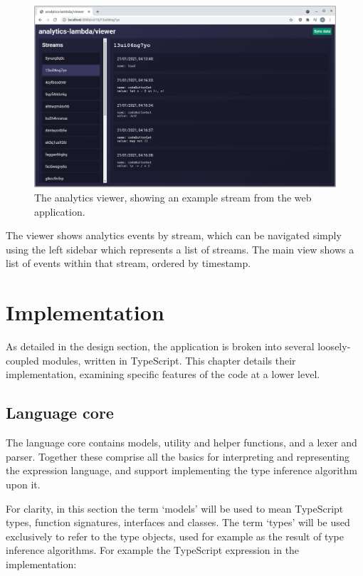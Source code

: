 \documentclass[a4paper,fleqn,twoside,12pt]{report}
\begin{document}
\begin{figure}[h!]
  \centering
  \includegraphics[width=1.000\linewidth]{images/image16.png}
  \caption{The analytics viewer, showing an example stream from the web application.}
\end{figure}

The viewer shows analytics events by stream, which can be navigated simply using the left sidebar which represents a list of streams. The main view shows a list of events within that stream, ordered by timestamp.
\chapter{Implementation}\label{id:h.igepudpadp49}
As detailed in the design section, the application is broken into several loosely-coupled modules, written in TypeScript. This chapter details their implementation, examining specific features of the code at a lower level.

\section{Language core}\label{id:h.o3ngfa303saw}
The language core contains models, utility and helper functions, and a lexer and parser. Together these comprise all the basics for interpreting and representing the expression language, and support implementing the type inference algorithm upon it.

For clarity, in this section the term ‘models’ will be used to mean TypeScript types, function signatures, interfaces and classes. The term ‘types’ will be used exclusively to refer to the type objects, used for example as the result of type inference algorithms. For example the TypeScript expression in the implementation:
\end{document}
